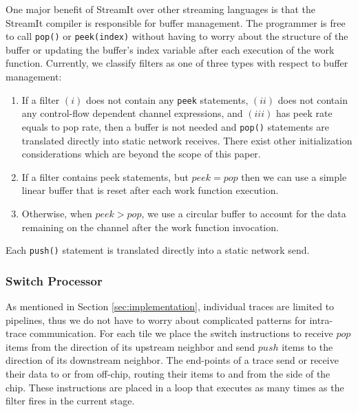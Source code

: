 One major benefit of StreamIt over other streaming languages is that
the StreamIt compiler is responsible for buffer management.  The
programmer is free to call {\tt pop()} or {\tt peek(index)} without
having to worry about the structure of the buffer or updating the
buffer's index variable after each execution of the work function.
Currently, we classify filters as one of three types with respect to
buffer management:
\begin{enumerate}
\item If a filter $(i)$ does not contain any {\tt peek} statements, $(ii)$
does not contain any control-flow dependent channel expressions, and
$(iii)$ has peek rate equals to pop rate, then a buffer is not needed
and {\tt pop()} statements are translated directly into static network
receives.  There exist other initialization considerations which are
beyond the scope of this paper.
\item If a filter contains peek statements, but $peek = pop$ then we can
use a simple linear buffer that is reset after each work function execution.
\item Otherwise, when $peek > pop$, we use a circular buffer to
account for the data remaining on the channel after the work function
invocation.
\end{enumerate}
Each {\tt push()} statement is translated directly into a static
network send.  

\subsubsection{Switch Processor}
As mentioned in Section \ref{sec:implementation}, individual traces
are limited to pipelines, thus we do not have to worry about
complicated patterns for intra-trace communication.  For each tile we
place the switch instructions to receive $pop$ items from the
direction of its upstream neighbor and send $push$ items to the
direction of its downstream neighbor.  The end-points of a trace send
or receive their data to or from off-chip, routing their items to and
from the side of the chip. These instructions are placed in a loop
that executes as many times as the filter fires in the current stage.

